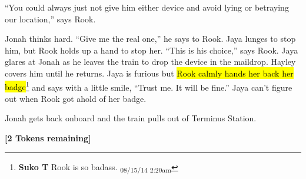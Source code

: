 ``You could always just not give him either device and avoid lying or betraying our location,'' says Rook.

Jonah thinks hard.  ``Give me the real one,'' he says to Rook.  Jaya lunges to stop him, but Rook holds up a hand to stop her.  ``This is his choice,'' says Rook.  Jaya glares at Jonah as he leaves the train to drop the device in the maildrop.  Hayley covers him until he returns.  Jaya is furious but \hl{Rook calmly hands her back her badge}\footnote{\textbf{Suko T }Rook is so badass. \textsubscript{08/15/14 2:20am}} and says with a little smile, ``Trust me. It will be fine.''  Jaya can't figure out when Rook got ahold of her badge.



Jonah gets back onboard and the train pulls out of Terminus Station.



\textbf{{[}2 Tokens remaining{]}}







